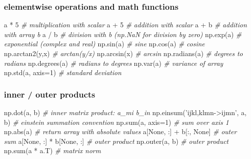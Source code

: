 \documentclass[10pt,a4paperpaper,twocolumn]{article}
\newenvironment{Shaded}{}{}
\newcommand{\DecValTok}[1]{\textcolor[rgb]{0.25,0.63,0.44}{{#1}}}
\newcommand{\StringTok}[1]{\textcolor[rgb]{0.25,0.44,0.63}{{#1}}}
\newcommand{\CommentTok}[1]{\textcolor[rgb]{0.38,0.63,0.69}{\textit{{#1}}}}
\newcommand{\VariableTok}[1]{\textcolor[rgb]{0.10,0.09,0.49}{{#1}}}
\newcommand{\OperatorTok}[1]{\textcolor[rgb]{0.40,0.40,0.40}{{#1}}}
\newcommand{\BuiltInTok}[1]{{#1}}
\newcommand{\NormalTok}[1]{{#1}}
\begin{document}
\hypertarget{elementwise-operations-and-math-functions}{\subsubsection{elementwise
operations and math
functions}\label{elementwise-operations-and-math-functions}}

\begin{Shaded}
\begin{Highlighting}[]
\NormalTok{a }\OperatorTok{*} \DecValTok{5}              \CommentTok{# multiplication with scalar}
\NormalTok{a }\OperatorTok{+} \DecValTok{5}              \CommentTok{# addition with scalar}
\NormalTok{a }\OperatorTok{+} \NormalTok{b              }\CommentTok{# addition with array b}
\NormalTok{a }\OperatorTok{/} \NormalTok{b              }\CommentTok{# division with b (np.NaN for division by zero)}
\NormalTok{np.exp(a)          }\CommentTok{# exponential (complex and real)}
\NormalTok{np.sin(a)          }\CommentTok{# sine}
\NormalTok{np.cos(a)          }\CommentTok{# cosine}
\NormalTok{np.arctan2(y,x)    }\CommentTok{# arctan(y/x)}
\NormalTok{np.arcsin(x)       }\CommentTok{# arcsin}
\NormalTok{np.radians(a)      }\CommentTok{# degrees to radians}
\NormalTok{np.degrees(a)      }\CommentTok{# radians to degrees}
\NormalTok{np.var(a)          }\CommentTok{# variance of array}
\NormalTok{np.std(a, axis}\OperatorTok{=}\DecValTok{1}\NormalTok{)  }\CommentTok{# standard deviation}
\end{Highlighting}
\end{Shaded}

\subsubsection{inner / outer products}\label{inner-outer-products}

\begin{Shaded}
\begin{Highlighting}[]
\NormalTok{np.dot(a, b)                        }\CommentTok{# inner matrix product: a_mi b_in}
\NormalTok{np.einsum(}\StringTok{'ijkl,klmn->ijmn'}\NormalTok{, a, b)  }\CommentTok{# einstein summation convention}
\NormalTok{np.}\BuiltInTok{sum}\NormalTok{(a, axis}\OperatorTok{=}\DecValTok{1}\NormalTok{)                   }\CommentTok{# sum over axis 1}
\NormalTok{np.}\BuiltInTok{abs}\NormalTok{(a)                           }\CommentTok{# return array with absolute values}
\NormalTok{a[}\VariableTok{None}\NormalTok{, :] }\OperatorTok{+} \NormalTok{b[:, }\VariableTok{None}\NormalTok{]             }\CommentTok{# outer sum}
\NormalTok{a[}\VariableTok{None}\NormalTok{, :] }\OperatorTok{*} \NormalTok{b[}\VariableTok{None}\NormalTok{, :]             }\CommentTok{# outer product}
\NormalTok{np.outer(a, b)                      }\CommentTok{# outer product}
\NormalTok{np.}\BuiltInTok{sum}\NormalTok{(a }\OperatorTok{*} \NormalTok{a.T)                     }\CommentTok{# matrix norm}
\end{Highlighting}
\end{Shaded}
\end{document}
